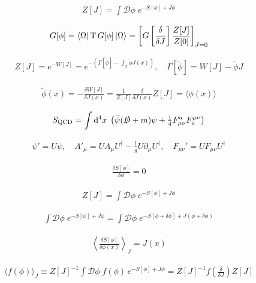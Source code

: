 \documentclass[oneside, openany]{book}
\numberwithin{equation}{chapter}
\numberwithin{figure}{chapter}
\newcommand{\ii}{\mathrm{i}}
\begin{document}
\begin{align}
	Z[J] = \int \mathcal D\phi\; e^{-S[\phi] + J\phi}
\end{align}

\begin{align}
	G[\phi] = \bra{\Omega} \mathrm{T}\, G[\phi]\ket{\Omega} = \left[G\left[\frac{\delta}{\delta J}\right] \frac{Z[J]}{Z[0]} \right]_{J=0}
\end{align}

\begin{align}
	Z[J] = e^{-W[J]} = e^{-(\Gamma[\tilde\phi] - \int_x \tilde\phi J(x))}, \quad \Gamma[\tilde\phi] = W[J] - \tilde\phi J %
\end{align}

\begin{align}
	\tilde\phi(x) = -\frac{\delta W[J]}{\delta J(x)} = \frac{1}{Z[J]} \frac{\delta}{\delta J(x)} Z[J] = \langle \phi(x) \rangle
\end{align}

\begin{align}
	S_\text{QCD} = \int \dd^4 x\; \left( \bar\psi(\slashed D + m)\psi + \tfrac{1}{4}F^a_{\mu\nu}F_a^{\mu\nu} \right)
\end{align}

\begin{align}
	\psi' = U\psi, \quad A'_\mu = U A_\mu U^\dagger - \frac{\ii}{g}U\partial_\mu U^\dagger, \quad F_{\mu\nu}' = U F_{\mu\nu} U^\dagger
\end{align}

\begin{align}
	\frac{\delta S[\phi]}{\delta \phi} = 0
\end{align}

\begin{align}
	Z[J] = \int\mathcal D \phi\; e^{-S[\phi] + J\phi}
\end{align}

\begin{align}
	\int\mathcal D \phi\; e^{-S[\phi] + J\phi} = \int\mathcal D \phi\; e^{-S[\phi + \delta\phi] + J(\phi + \delta\phi)}
\end{align}

\begin{align}
	\left\langle \frac{\delta S[\phi]}{\delta \phi(x)}\right\rangle_J = J(x)
\end{align}

\begin{align}
	\langle f(\phi)\rangle_J \equiv Z[J]^{-1} \int \mathcal D\phi\; f(\phi)\, e^{-S[\phi]+J\phi} = Z[J]^{-1} f\left( \frac{\delta}{\delta J} \right) Z[J]
\end{align}
\end{document}
